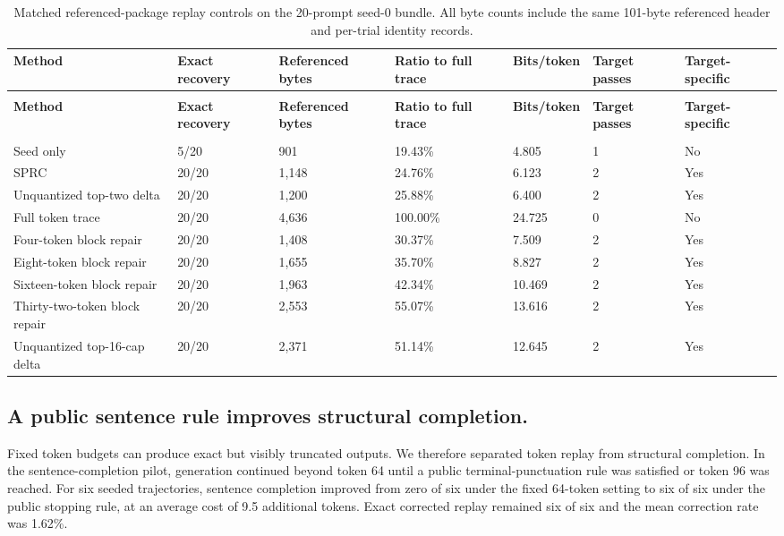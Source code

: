 \documentclass{nature}
\begin{document}
\clearpage
\begingroup
\scriptsize
\setlength{\tabcolsep}{2.5pt}
\renewcommand{\arraystretch}{1.22}
\begin{xltabular}{\textwidth}{@{}>{\raggedright\arraybackslash}X *{6}{Y}@{}}
\caption{Matched referenced-package replay controls on the 20-prompt seed-0 bundle. All byte counts include the same 101-byte referenced header and per-trial identity records.}\label{tab:2} \\
\toprule
\textbf{Method} & \textbf{Exact recovery} & \textbf{Referenced bytes} & \textbf{Ratio to full trace} & \textbf{Bits/token} & \textbf{Target passes} & \textbf{Target-specific} \\
\midrule
\endfirsthead
{} \\
\toprule
\textbf{Method} & \textbf{Exact recovery} & \textbf{Referenced bytes} & \textbf{Ratio to full trace} & \textbf{Bits/token} & \textbf{Target passes} & \textbf{Target-specific} \\
\midrule
\endhead
\midrule
{} \\
\endfoot
\bottomrule
\endlastfoot
Seed only & 5/20 & 901 & 19.43\% & 4.805 & 1 & No \\
SPRC & 20/20 & 1,148 & 24.76\% & 6.123 & 2 & Yes \\
Unquantized top-two delta & 20/20 & 1,200 & 25.88\% & 6.400 & 2 & Yes \\
Full token trace & 20/20 & 4,636 & 100.00\% & 24.725 & 0 & No \\
Four-token block repair & 20/20 & 1,408 & 30.37\% & 7.509 & 2 & Yes \\
Eight-token block repair & 20/20 & 1,655 & 35.70\% & 8.827 & 2 & Yes \\
Sixteen-token block repair & 20/20 & 1,963 & 42.34\% & 10.469 & 2 & Yes \\
Thirty-two-token block repair & 20/20 & 2,553 & 55.07\% & 13.616 & 2 & Yes \\
Unquantized top-16-cap delta & 20/20 & 2,371 & 51.14\% & 12.645 & 2 & Yes \\
\end{xltabular}
\endgroup
\clearpage
\subsection{A public sentence rule improves structural completion.}
Fixed token budgets can produce exact but visibly truncated outputs. We therefore separated token replay from structural completion. In the sentence-completion pilot, generation continued beyond token 64 until a public terminal-punctuation rule was satisfied or token 96 was reached. For six seeded trajectories, sentence completion improved from zero of six under the fixed 64-token setting to six of six under the public stopping rule, at an average cost of 9.5 additional tokens. Exact corrected replay remained six of six and the mean correction rate was 1.62\%.
\end{document}

